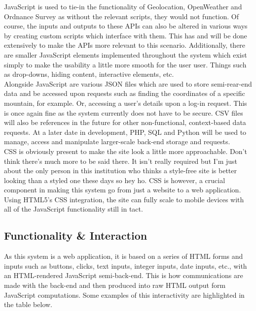 \documentclass[11pt, english]{article}
\begin{document}
	JavaScript is used to tie-in the functionality of Geolocation, OpenWeather and Ordnance Survey as without the relevant scripts, they would not function. Of course, the inputs and outputs to these APIs can also be altered in various ways by creating custom scripts which interface with them. This has and will be done extensively to make the APIs more relevant to this scenario. Additionally, there are smaller JavaScript elements implemented throughout the system which exist simply to make the usability a little more smooth for the user user. Things such as drop-downs, hiding content, interactive elements, etc.\\

	Alongside JavaScript are various JSON files which are used to store semi-rear-end data and be accessed upon requests such as finding the coordinates of a specific mountain, for example. Or, accessing a user's details upon a log-in request. This is once again fine as the system currently does not have to be secure. CSV files will also be references in the future for other non-functional, context-based data requests. At a later date in development, PHP, SQL and Python will be used to manage, access and manipulate larger-scale back-end storage and requests.\\

	CSS is obviously present to make the site look a little more approachable. Don't think there's much more to be said there. It isn't really required but I'm just about the only person in this institution who thinks a style-free site is better looking than a styled one these days so hey ho. CSS is however, a crucial component in making this system go from just a website to a web application. Using HTML5's CSS integration, the site can fully scale to mobile devices with all of the JavaScript functionality still in tact.

	\subsection{Functionality \& Interaction}

	As this system is a web application, it is based on a series of HTML forms and inputs such as buttons, clicks, text inputs, integer inputs, date inputs, etc., with an HTML-rendered JavaScript semi-back-end. This is how communications are made with the back-end and then produced into raw HTML output form JavaScript computations. Some examples of this interactivity are highlighted in the table below.

\newpage
\end{document}
